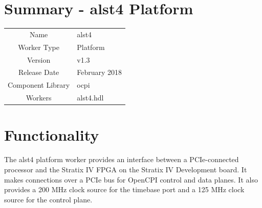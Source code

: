 \documentclass{article}
\author{} %
\date{Version \docVersion} %
\title{\docTitle}
\def\docVersion{1.3}
\def\comp{alst4}
\def\Comp{alst4 Platform}
\begin{document}
\section*{Summary - \Comp}
\begin{tabular}{|c|M{13.5cm}|}
	\hline
	                  &                                                    \\
	\hline
	Name              & \comp                                              \\
	\hline
	Worker Type       & Platform                                           \\
	\hline
	Version           & v\docVersion \\
	\hline
	Release Date      & February 2018 \\
	\hline
	Component Library & ocpi                                        \\
	\hline
	Workers & \comp.hdl                                        \\
	\hline
\end{tabular}

\section*{Functionality}
\begin{flushleft}
The alst4 platform worker provides an interface between a PCIe-connected processor and the Stratix IV FPGA on the Stratix IV Development board. It makes connections over a PCIe bus for OpenCPI control and data planes. It also provides a 200 MHz clock source for the timebase port and a 125 MHz clock source for the control plane.
\end{flushleft}
\end{document}
